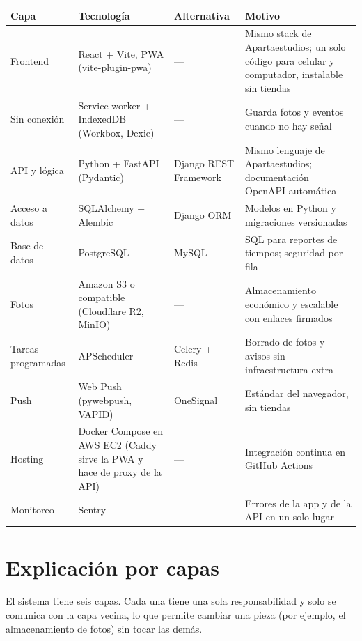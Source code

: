 \documentclass[11pt,a4paper]{article}
\begin{document}
\begin{center}
\small
\begin{tabularx}{\linewidth}{L{2.6cm} L{3.6cm} L{3.2cm} Y}
\toprule
\textbf{Capa} & \textbf{Tecnología} & \textbf{Alternativa} & \textbf{Motivo}\\
\midrule
Frontend & React + Vite, PWA (vite-plugin-pwa) & --- & Mismo stack de Apartaestudios; un solo código para celular y computador, instalable sin tiendas\\
Sin conexión & Service worker + IndexedDB (Workbox, Dexie) & --- & Guarda fotos y eventos cuando no hay señal\\
API y lógica & Python + FastAPI (Pydantic) & Django REST Framework & Mismo lenguaje de Apartaestudios; documentación OpenAPI automática\\
Acceso a datos & SQLAlchemy + Alembic & Django ORM & Modelos en Python y migraciones versionadas\\
Base de datos & PostgreSQL & MySQL & SQL para reportes de tiempos; seguridad por fila\\
Fotos & Amazon S3 o compatible (Cloudflare R2, MinIO) & --- & Almacenamiento económico y escalable con enlaces firmados\\
Tareas programadas & APScheduler & Celery + Redis & Borrado de fotos y avisos sin infraestructura extra\\
Push & Web Push (pywebpush, VAPID) & OneSignal & Estándar del navegador, sin tiendas\\
Hosting & Docker Compose en AWS EC2 (Caddy sirve la PWA y hace de proxy de la API) & --- & Integración continua en GitHub Actions\\
Monitoreo & Sentry & --- & Errores de la app y de la API en un solo lugar\\
\bottomrule
\end{tabularx}
\end{center}

\section{Explicación por capas}

El sistema tiene seis capas. Cada una tiene una sola responsabilidad y solo se comunica con la capa vecina, lo que permite cambiar una pieza (por ejemplo, el almacenamiento de fotos) sin tocar las demás.
\end{document}
